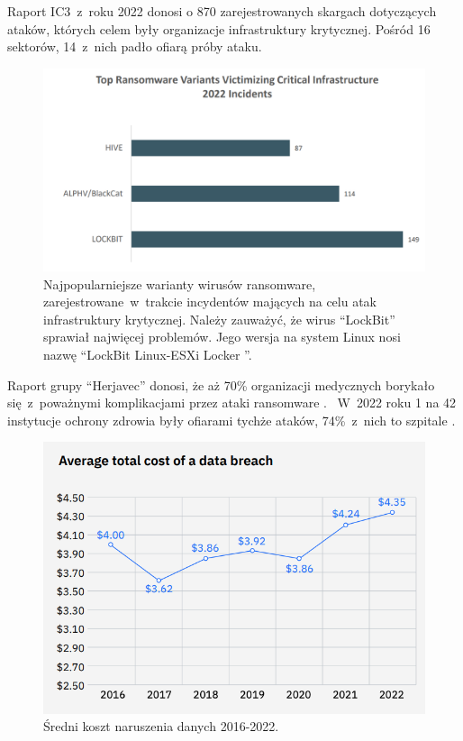  Raport IC3~z~roku 2022 donosi o 870 zarejestrowanych skargach dotyczących ataków, których celem były organizacje infrastruktury krytycznej. Pośród 16 sektorów, 14~z~nich padło ofiarą próby ataku.
  \begin{figure}[H]
     \centering
     \includegraphics[width=0.75\linewidth]{rysunki/topransomwares2022.png}
     \caption{Najpopularniejsze warianty wirusów ransomware, zarejestrowane~w~trakcie incydentów mających na celu atak infrastruktury krytycznej. Należy zauważyć, że wirus \foreignquote{english}{LockBit} sprawiał najwięcej problemów. Jego wersja na system Linux nosi nazwę \foreignquote{english}{LockBit Linux-ESXi Locker }\protect\footnotemark.}
     \label{fig:enter-label}
 \end{figure}

 Raport grupy \foreignquote{english}{Herjavec} donosi, że aż 70\% organizacji medycznych borykało się~z~poważnymi komplikacjami przez ataki ransomware \cite{health}.
~W~2022 roku 1 na 42 instytucje ochrony zdrowia były ofiarami tychże ataków, 74\%~z~nich to szpitale 
 \cite{etal_check_2022}.
 \begin{figure}[H]
    \centering
    \includegraphics[width=0.7\linewidth]{rysunki/costOfDataBreach.png}
    \caption{Średni koszt naruszenia danych 2016-2022\protect\footnotemark.}
    \label{fig:enter-label}
\end{figure}

